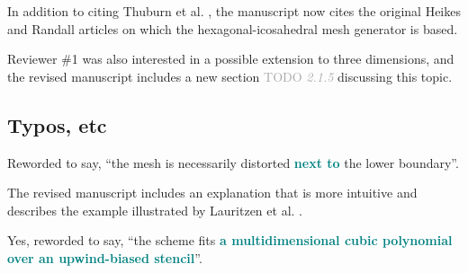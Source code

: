 \documentclass[times]{elsarticle}
\newcommand{\TODO}[1]{\textcolor{darkgray}{TODO \textit{#1}}}
\newcommand{\revtwo}[1]{\textcolor{teal}{\textbf{#1}}}
\begin{document}
In addition to citing Thuburn et al. \citep{thuburn2014}, the manuscript now cites the original Heikes and Randall articles \citep{heikes-randall1995a,heikes-randall1995b} on which the hexagonal-icosahedral mesh generator is based.

\begin{quotation}
\begin{comment}
\item Some brief comments on how the approach extends to three dimensions would be
appropriate.
\end{comment}
\end{quotation}
Reviewer \#1 was also interested in a possible extension to three dimensions, and the revised manuscript includes a new section \TODO{2.1.5} discussing this topic.

\subsection*{Typos, etc}

\begin{quotation}
\begin{comment}
\item Introduction, second sentence: `modification of the lower boundary' is an odd way to
think of it.
\end{comment}
\end{quotation}
Reworded to say, ``the mesh is necessarily distorted \revtwo{next to} the lower boundary''.

\begin{quotation}
\begin{comment}
\item P2, 5 lines from the bottom: `...non-simply connected domains...'. I found this
phrase confusing.
\end{comment}
\end{quotation}
The revised manuscript includes an explanation that is more intuitive and describes the example illustrated by Lauritzen et al. \citep{lauritzen2011}.

\begin{quotation}
\begin{comment}
\item P3 line 17: `cubic, upwind-biased stencil'. Surely it is the polynomial that is
cubic, rather than the stencil?
\end{comment}
\end{quotation}
Yes, reworded to say, ``the scheme fits \revtwo{a multidimensional cubic polynomial over an upwind-biased stencil}''.
\end{document}
